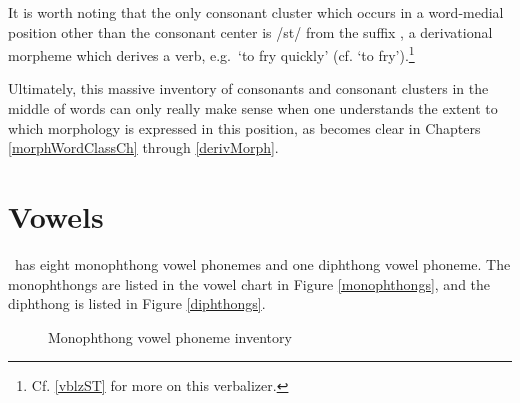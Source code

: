 It is worth noting that the only consonant cluster which occurs in a word-medial position other than the consonant center is /st/ from the suffix , a derivational morpheme
which derives a verb, e.g.\, ‘to fry quickly’ (cf.  ‘to fry’).\footnote{Cf. \SEC\ref{vblzST} for more on this verbalizer.} %

Ultimately, this massive inventory of consonants and consonant clusters in the middle of words can only really make sense when one understands the extent to which morphology is expressed in this position, as becomes clear in Chapters \ref{morphWordClassCh} through \ref{derivMorph}. 



\FB

\section{Vowels}\label{vowels}\label{vowelPhonemes}
\PS\ has eight monophthong vowel phonemes and one diphthong vowel phoneme. The monophthongs are listed in the vowel chart in Figure \vref{monophthongs}, and the diphthong is listed in Figure \vref{diphthongs}. 
\begin{figure}[t]
\centering
\begin{vowel} %
\end{vowel}
\caption[Monophthong inventory]{Monophthong vowel phoneme inventory} \label{monophthongs}
\end{figure}

